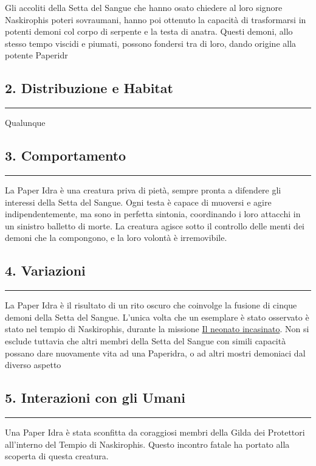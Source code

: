 Gli accoliti della Setta del Sangue che hanno osato chiedere al loro
signore Naskirophis poteri sovraumani, hanno poi ottenuto la capacità di
trasformarsi in potenti demoni col corpo di serpente e la testa di
anatra. Questi demoni, allo stesso tempo viscidi e piumati, possono
fondersi tra di loro, dando origine alla potente Paperidr

\subsection{2. Distribuzione e Habitat}\label{distribuzione-e-habitat}

\begin{center}\rule{0.5\linewidth}{0.5pt}\end{center}

Qualunque

\subsection{3. Comportamento}\label{comportamento}

\begin{center}\rule{0.5\linewidth}{0.5pt}\end{center}

La Paper Idra è una creatura priva di pietà, sempre pronta a difendere
gli interessi della Setta del Sangue. Ogni testa è capace di muoversi e
agire indipendentemente, ma sono in perfetta sintonia, coordinando i
loro attacchi in un sinistro balletto di morte. La creatura agisce sotto
il controllo delle menti dei demoni che la compongono, e la loro volontà
è irremovibile.

\subsection{4. Variazioni}\label{variazioni}

\begin{center}\rule{0.5\linewidth}{0.5pt}\end{center}

La Paper Idra è il risultato di un rito oscuro che coinvolge la fusione
di cinque demoni della Setta del Sangue. L'unica volta che un esemplare
è stato osservato è stato nel tempio di Naskirophis, durante la missione
\href{Il\%20neonato\%20incasinato\%2090743e94446c4f5a846f18c37fd80698.md}{Il
neonato incasinato}. Non si esclude tuttavia che altri membri della
Setta del Sangue con simili capacità possano dare nuovamente vita ad una
Paperidra, o ad altri mostri demoniaci dal diverso aspetto

\subsection{5. Interazioni con gli
Umani}\label{interazioni-con-gli-umani}

\begin{center}\rule{0.5\linewidth}{0.5pt}\end{center}

Una Paper Idra è stata sconfitta da coraggiosi membri della Gilda dei
Protettori all'interno del Tempio di Naskirophis. Questo incontro fatale
ha portato alla scoperta di questa creatura.
